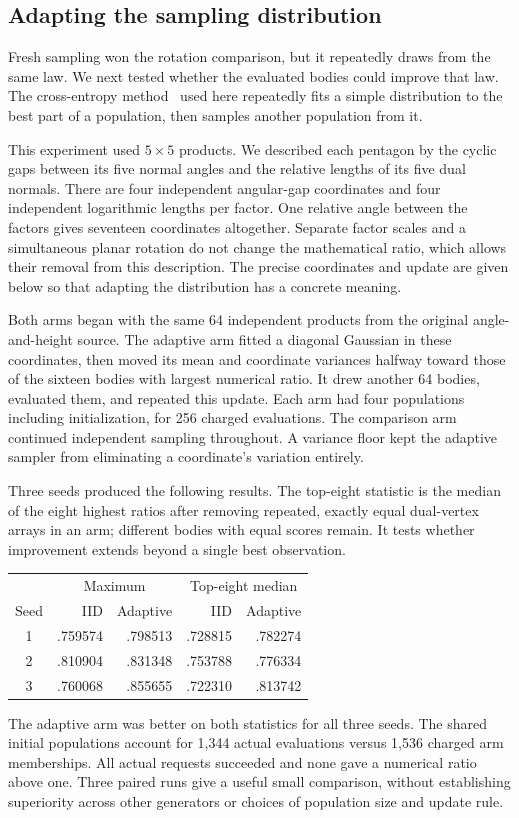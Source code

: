 \subsection{Adapting the sampling distribution}

Fresh sampling won the rotation comparison, but it repeatedly draws from the
same law. We next tested whether the evaluated bodies could improve that law.
The cross-entropy method~\cite{dsDeBoer2005} used here repeatedly fits a simple distribution to
the best part of a population, then samples another population from it.

This experiment used $5\times5$ products. We described each pentagon by the
cyclic gaps between its five normal angles and the relative lengths of its
five dual normals. There are four independent angular-gap coordinates and
four independent logarithmic lengths per factor. One relative angle between
the factors gives seventeen coordinates altogether. Separate factor scales
and a simultaneous planar rotation do not change the mathematical ratio,
which allows their removal from this description. The precise coordinates
and update are given below so that adapting the distribution has a concrete
meaning.

Both arms began with the same 64 independent products from the original
angle-and-height source. The adaptive arm fitted a diagonal Gaussian in these
coordinates, then moved its mean and coordinate variances halfway toward
those of the sixteen bodies with largest numerical ratio. It drew another
64 bodies, evaluated them, and repeated this update. Each arm had four
populations including initialization, for 256 charged evaluations. The
comparison arm continued independent sampling throughout. A variance floor
kept the adaptive sampler from eliminating a coordinate's variation entirely.

Three seeds produced the following results. The top-eight statistic is the
median of the eight highest ratios after removing repeated, exactly equal
dual-vertex arrays in an arm; different bodies with equal scores remain. It tests
whether improvement extends beyond a single best observation.
\begin{center}
\begin{tabular}{crrrr}
\hline
 & \multicolumn{2}{c}{Maximum} & \multicolumn{2}{c}{Top-eight median}\\
Seed & IID & Adaptive & IID & Adaptive\\
\hline
1 & .759574 & .798513 & .728815 & .782274\\
2 & .810904 & .831348 & .753788 & .776334\\
3 & .760068 & .855655 & .722310 & .813742\\
\hline
\end{tabular}
\end{center}
The adaptive arm was better on both statistics for all three seeds.
The shared initial populations account for 1,344 actual evaluations versus
1,536 charged arm memberships. All actual requests succeeded and none gave
a numerical ratio above one. Three paired runs give a useful small
comparison, without establishing superiority across other generators or
choices of population size and update rule.

